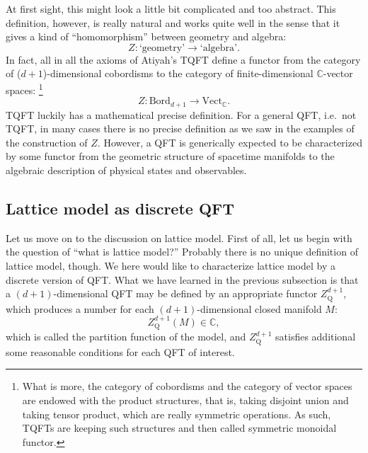 At first sight, this might look a little bit complicated and too abstract.
This definition, however, is really natural and works quite well in
the sense that it gives a kind of ``homomorphism'' between geometry
and algebra:
\begin{equation*}
  Z : \text{`geometry'} \longrightarrow \text{`algebra'}.
\end{equation*}
In fact, all in all the axioms of Atiyah's TQFT define a functor
from the category of ($d+1$)-dimensional cobordisms to the category
of finite-dimensional $\mathbb{C}$-vector spaces:%
%
\footnote{What is more, the category of cobordisms and the category of vector
spaces are endowed with the product structures, that is, taking disjoint
union and taking tensor product, which are really symmetric operations.
As such, TQFTs are keeping such structures and then
called symmetric monoidal functor. }
%
\begin{equation}
  Z:\mathrm{Bord}_{d+1}  \longrightarrow  \mathrm{Vect}_{\mathbb{C}}.
\end{equation}
TQFT luckily has a mathematical precise definition. For a general
QFT, i.e.~not TQFT, in many cases there is no precise definition as
we saw in the examples of the construction of $Z$. However, a QFT is
generically expected to be characterized by some functor from the
geometric structure of spacetime manifolds to the algebraic description
of physical states and observables.







\subsection{Lattice model as discrete QFT}
\label{sec:lattice_model}

Let us move on to the discussion on lattice model. First of all,
let us begin with the question of ``what is lattice model?'' Probably
there is no unique definition of lattice model, though. We here would like
to characterize lattice model by a discrete version of QFT. What we
have learned in the previous subsection is that a $(d+1)$-dimensional
QFT may be defined by an appropriate functor $Z_{\mathrm{Q}}^{d+1}$,
which produces a number for each $(d+1)$-dimensional closed manifold
$M$:
\begin{equation}
  Z_{\mathrm{Q}}^{d+1}(M)  \in  \mathbb{C},
\end{equation}
which is called the partition function of the model, and $Z_{\mathrm{Q}}^{d+1}$
satisfies additional some reasonable conditions for each QFT of interest.

